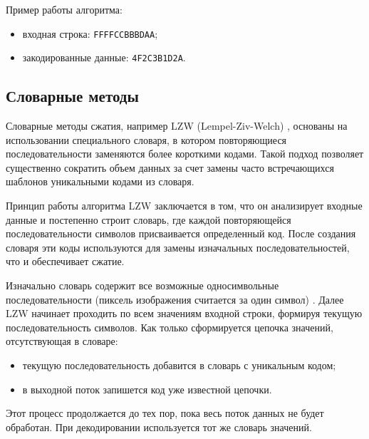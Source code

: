 Пример работы алгоритма:
\begin{itemize}
    \item входная строка: \texttt{FFFFCCBBBDAA};
    \item закодированные данные: \texttt{4F2C3B1D2A}.
\end{itemize}

\subsection{Словарные методы}

Словарные методы сжатия, например LZW (Lempel-Ziv-Welch) \cite{LZW}, основаны на использовании специального словаря, в котором повторяющиеся последовательности заменяются более короткими кодами. Такой подход позволяет существенно сократить объем данных за счет замены часто встречающихся шаблонов уникальными кодами из словаря.

Принцип работы алгоритма LZW заключается в том, что он анализирует входные данные и постепенно строит словарь, где каждой повторяющейся последовательности символов присваивается определенный код. После создания словаря эти коды используются для замены изначальных последовательностей, что и обеспечивает сжатие.

Изначально словарь содержит все возможные односимвольные последовательности (пиксель изображения считается за один символ) \cite{article-lzw}. Далее LZW начинает проходить по всем значениям входной строки, формируя текущую последовательность символов. 
Как только сформируется цепочка значений, отсутствующая в словаре:
\begin{itemize}
    \item текущую последовательность добавится в словарь с уникальным кодом;
    \item в выходной поток запишется код уже известной цепочки.
\end{itemize}
Этот процесс продолжается до тех пор, пока весь поток данных не будет обработан. При декодировании используется тот же словарь значений.

